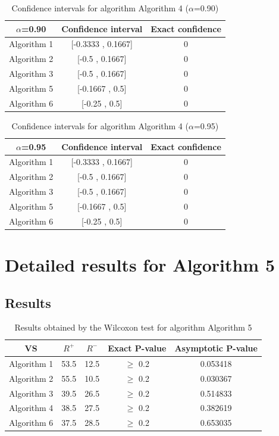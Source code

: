\documentclass[a4paper,10pt]{article}
\begin{document}
\begin{table}[!htp]
\centering\small
\begin{tabular}{
|c|c|c|}
\hline
 $\alpha$=0.90 & Confidence interval & Exact confidence \\ \hline 
Algorithm 1 & [-0.3333 , 0.1667] & 0\\ \hline 
Algorithm 2 & [-0.5 , 0.1667] & 0\\ \hline 
Algorithm 3 & [-0.5 , 0.1667] & 0\\ \hline 
Algorithm 5 & [-0.1667 , 0.5] & 0\\ \hline 
Algorithm 6 & [-0.25 , 0.5] & 0\\ \hline 

\end{tabular}
\caption{Confidence intervals for algorithm Algorithm 4 ($\alpha$=0.90)}
\end{table}
\begin{table}[!htp]
\centering\small
\begin{tabular}{
|c|c|c|}
\hline
 $\alpha$=0.95 & Confidence interval & Exact confidence \\ \hline 
Algorithm 1 & [-0.3333 , 0.1667] & 0\\ \hline 
Algorithm 2 & [-0.5 , 0.1667] & 0\\ \hline 
Algorithm 3 & [-0.5 , 0.1667] & 0\\ \hline 
Algorithm 5 & [-0.1667 , 0.5] & 0\\ \hline 
Algorithm 6 & [-0.25 , 0.5] & 0\\ \hline 

\end{tabular}
\caption{Confidence intervals for algorithm Algorithm 4 ($\alpha$=0.95)}
\end{table}

 \clearpage 


\section{Detailed results for Algorithm 5}


\subsection{Results}

\begin{table}[!htp]
\centering\small
\begin{tabular}{
|c|c|c|c|c|}
\hline
 VS & $R^{+}$ & $R^{-}$ & Exact P-value & Asymptotic P-value \\ \hline 
Algorithm 1 & 53.5 & 12.5 & $\geq$ 0.2 & 0.053418\\ \hline 
Algorithm 2 & 55.5 & 10.5 & $\geq$ 0.2 & 0.030367\\ \hline 
Algorithm 3 & 39.5 & 26.5 & $\geq$ 0.2 & 0.514833\\ \hline 
Algorithm 4 & 38.5 & 27.5 & $\geq$ 0.2 & 0.382619\\ \hline 
Algorithm 6 & 37.5 & 28.5 & $\geq$ 0.2 & 0.653035\\ \hline 

\end{tabular}
\caption{Results obtained by the Wilcoxon test for algorithm Algorithm 5}
\end{table}
\end{document}
